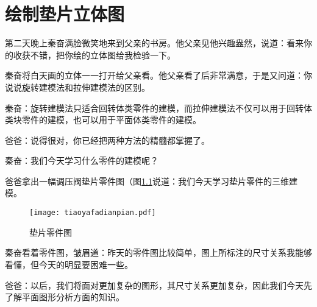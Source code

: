 \chapter{绘制垫片立体图}\label{chap:dianpian}
第二天晚上秦奋满脸微笑地来到父亲的书房。他父亲见他兴趣盎然，说道：看来你的收获不错，把你绘的立体图给我检验一下。

秦奋将白天画的立体一一打开给父亲看。他父亲看了后非常满意，于是又问道：你说说旋转建模法和拉伸建模法的区别。

秦奋：旋转建模法只适合回转体类零件的建模，而拉伸建模法不仅可以用于回转体类块零件的建模，也可以用于平面体类零件的建模。

爸爸：说得很对，你已经把两种方法的精髓都掌握了。

秦奋：我们今天学习什么零件的建模呢？

爸爸拿出一幅调压阀垫片零件图（图\ref{fig:tiaoyafadianpian}说道：我们今天学习垫片零件的三维建模。

\noindent
\begin{figure}[htbp]
\centering
\texttt{[image: tiaoyafadianpian.pdf]}
\caption{垫片零件图}\label{fig:tiaoyafadianpian}
\end{figure}

秦奋看着零件图，皱眉道：昨天的零件图比较简单，图上所标注的尺寸关系我能够看懂，但今天的明显要困难一些。

爸爸：以后，我们将面对更加复杂的图形，其尺寸关系更加复杂，因此我们今天先了解平面图形分析方面的知识。
\endinput